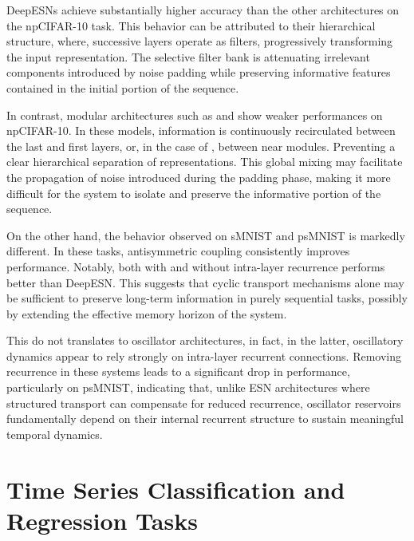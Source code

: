 DeepESNs achieve substantially higher accuracy than the other architectures on the npCIFAR-10 task. 
This behavior can be attributed to their hierarchical structure, where,
successive layers operate as filters, progressively transforming the input representation.
The selective filter bank is attenuating irrelevant components introduced by noise padding while preserving informative
features contained in the initial portion of the sequence.

In contrast, modular architectures such as \DCR\@ and \DAO\@ show weaker performances on npCIFAR-10. 
In these models, information is continuously recirculated between the last and first layers, or, in the case of \DAR\@, between near modules.
Preventing a clear hierarchical separation of representations. This global mixing may facilitate the propagation 
of noise introduced during the padding phase, making it more difficult for the system to isolate and preserve the
 informative portion of the sequence.

On the other hand, the behavior observed on sMNIST and psMNIST is markedly different. 
In these tasks, antisymmetric coupling consistently improves performance.
 Notably, \DCR\@ both with and without intra-layer recurrence performs better than DeepESN.
  This suggests that cyclic transport mechanisms alone may be sufficient to preserve long-term information in purely sequential tasks,
   possibly by extending the effective memory horizon of the system.

This do not translates to oscillator architectures, in fact, 
in the latter, oscillatory dynamics appear to rely strongly on intra-layer recurrent connections.
Removing recurrence in these systems leads to a significant drop in performance, particularly on psMNIST, 
indicating that, unlike ESN architectures where structured transport can compensate for reduced recurrence,
 oscillator reservoirs fundamentally depend on their internal recurrent structure to sustain meaningful temporal dynamics.

\section{Time Series Classification and Regression Tasks}

